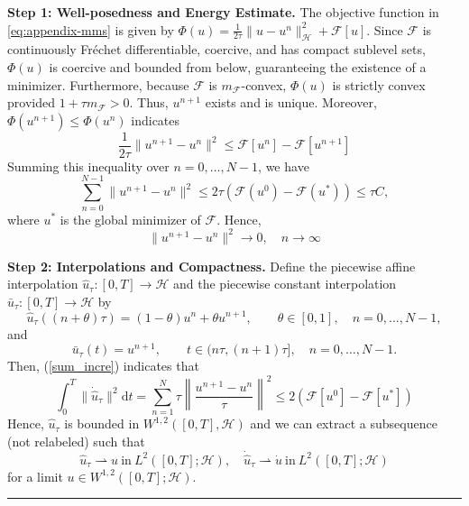 \documentclass[twoside,11pt]{article}
\newcommand{\BlackBoxProof}{\rule{1.5ex}{1.5ex}}
\renewenvironment{proof}{\par\noindent{\bf Proof\ }}{\hfill\BlackBoxProof\par\medskip}
\newcommand{\dd}{\mathrm{d}}
\newcommand{\calF}{\mathcal{F}}
\newcommand{\calH}{\mathcal{H}}
\begin{document}
\begin{proof} 

\noindent \textbf{Step 1: Well-posedness and Energy Estimate.} The objective function in \eqref{eq:appendix-mms} is given by $\Phi(u) = \frac{1}{2\tau}\|u-u^n\|_{\calH}^2+\calF[u]$. Since $\calF$ is continuously Fr\'echet differentiable, coercive, and has compact sublevel sets, $\Phi(u)$ is coercive and bounded from below, guaranteeing the existence of a minimizer. Furthermore, because $\calF$ is $m_{\calF}$-convex, $\Phi(u)$ is strictly convex provided $1 + \tau m_{\calF} > 0$. Thus, $u^{n+1}$ exists and is unique. Moreover, $\Phi(u^{n+1}) \le \Phi(u^n)$ indicates
\begin{equation}
 \frac{1}{2 \tau} \| u^{n+1} - u^n \|^2 \leq \mathcal{F}[u^{n}] - \mathcal{F}[u^{n+1}]
\end{equation}
Summing this inequality over $n=0, \dots, N-1$, we have
\begin{equation}\label{sum_incre}
 \sum_{n=0}^{N-1}\| u^{n+1} - u^n \|^2 \leq 2 \tau (\mathcal{F}(u^0) - \mathcal{F}(u^*) ) \leq \tau C  ,
\end{equation}
where $u^*$ is the global minimizer of $\mathcal{F}$. Hence,
\begin{equation}
  \| u^{n+1} - u^n \|^2 \rightarrow 0, \quad n \rightarrow \infty
\end{equation}


\noindent \textbf{Step 2: Interpolations and Compactness.} Define the piecewise affine interpolation $\hat u_\tau:[0,T]\to\mathcal H$ and the piecewise constant interpolation $\bar u_\tau:[0,T]\to\mathcal H$ by
\[
\hat u_\tau((n+\theta)\tau)
=(1-\theta)u^n+\theta u^{n+1},
\qquad \theta\in[0,1],\quad n=0,\dots,N-1,
\]
and
\[
\bar u_\tau(t)=u^{n+1},
\qquad t\in(n\tau,(n+1)\tau],\quad n=0,\dots,N-1.
\]
Then, (\ref{sum_incre}) indicates that
\begin{equation}
\int_{0}^T  \| \dot{\hat{u}}_{\tau} \|^2 \dd t = \sum_{n=1}^N \tau \left \| \frac{u^{n+1} - u^n}{\tau} \right \|^2 \leq 2 (\calF[u^0] - \calF[u^*])
\end{equation}
Hence, $\hat{u}_{\tau}$ is bounded in $W^{1, 2} ([0, T], \calH)$ and we can extract a subsequence (not relabeled) such that
\begin{equation}
\hat{u}_{\tau} \rightharpoonup u ~\text{in}~ L^2([0, T]; \calH), \quad \dot{\hat{u}}_{\tau} \rightharpoonup \dot{u} ~\text{in}~ L^2([0, T]; \calH)
\end{equation}
for a limit $u \in W^{1, 2} ([0, T]; \calH)$.


\end{proof}
\end{document}
